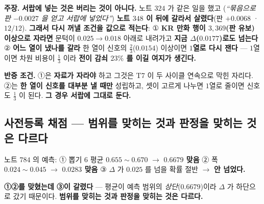 \documentclass[10pt,a4paper]{article}
\newcommand{\claim}[2]{\begin{claimbox}\textbf{주장.} #1\par\smallskip
  \textcolor{gray!70}{\textbf{반증 조건.} #2}\end{claimbox}}
\begin{document}
\claim{\textbf{서랍에 넣는 것은 버리는 것이 아니다.} 노트 $324$ 가 같은 일을 했고
(\emph{``묶음으로 판 $-0.0027$ 을 얻고 서랍에 넣었다''}) \textbf{노트 $348$ 이 뒤에
갈라서 살렸다}(판 $+0.0068$ · $12/12$). \textbf{그래서 다시 꺼낼 조건을 값으로 적는다}:
① \textbf{KR 만화 행이 $3{,}369$(판 유보) 이상으로 자라면} 문턱이 $0.025 \to 0.018$
아래로 내려가고 \textbf{지금 $\Delta$($0.0177$)로도 넘는다} ② \textbf{어느 열이 냈나를
갈라} 한 열이 신호의 $\frac{2}{3}$($0.0154$) 이상이면 \textbf{$1$열로 다시 잰다} ---
$1$열이면 차원 비용이 $\frac{1}{3}$ 이라 \textbf{전이 감쇠 $23\%$ 를 이길 여지가 생긴다.}}
{①은 \textbf{자료가 자라야} 하고 그것은 T7 이 두 사이클 연속으로 막힌 자리다. ②는
\textbf{한 열이 신호를 대부분 낼 때만} 성립하고, 셋이 고르게 나누면 $1$열로 줄이면
신호도 $\frac{1}{3}$ 이 된다. \textbf{그 경우 서랍에 그대로 둔다.}}

\subsection*{사전등록 채점 --- 범위를 맞히는 것과 판정을 맞히는 것은 다르다}

노트 $784$ 의 예측: ① 뽑기 $6$ 평균 $0.655 \sim 0.670$ $\to$ \textbf{$0.6679$ 맞음}
② 폭 $0.024 \sim 0.045$ $\to$ \textbf{$0.0283$ 맞음} ③ $\Delta$ 가 $0.025$ 를 넘을 확률
절반 $\to$ \textbf{안 넘었다.}

\textbf{①②를 맞혔는데 ③이 갈렸다} --- 평균이 예측 범위의 \emph{상단}($0.6679$)이라
$\Delta$ 가 하단으로 갔기 때문이다. \textbf{범위를 맞히는 것과 판정을 맞히는 것은
다르다.}
\end{document}
